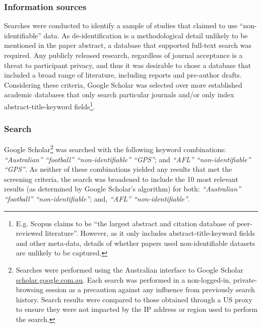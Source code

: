

\subsubsection{Information sources}

Searches were conducted to identify a sample of studies that claimed to use ``non-identifiable'' data. As de-identification is a methodological detail unlikely to be mentioned in the paper abstract, a database that supported full-text search was required. Any publicly released research, regardless of journal acceptance is a threat to participant privacy, and thus it was desirable to chose a database that included a broad range of literature, including reports and pre-author drafts. Considering these criteria, Google Scholar was selected over more established academic databases that only search particular journals and/or only index abstract-title-keyword fields\footnote{E.g. Scopus claims to be ``the largest abstract and citation database of peer-reviewed literature''. However, as it only includes abstract-title-keyword fields and other meta-data, details of whether papers used non-identifiable datasets are unlikely to be captured.}.

\subsubsection{Search}

Google Scholar\footnote{Searches were performed using the Australian interface to Google Scholar \url{scholar.google.com.au}. Each search was performed in a non-logged-in, private-browsing session as a precaution against any influence from previously search history. Search results were compared to those obtained through a US proxy to ensure they were not impacted by the IP address or region used to perform the search.}
 was searched with the following keyword combinations\footnotemark{}: \textit{``Australian'' ``football'' ``non-identifiable'' ``GPS''}; and \textit{``AFL'' ``non-identifiable'' ``GPS''}.
As neither of these combinations yielded any results that met the screening criteria, the search was broadened to include the 10 most relevant results (as determined by Google Scholar's algorithm\footnotemark{}) for both: \textit{``Australian'' ``football'' ``non-identifiable''}; and, \textit{``AFL'' ``non-identifiable''}.

